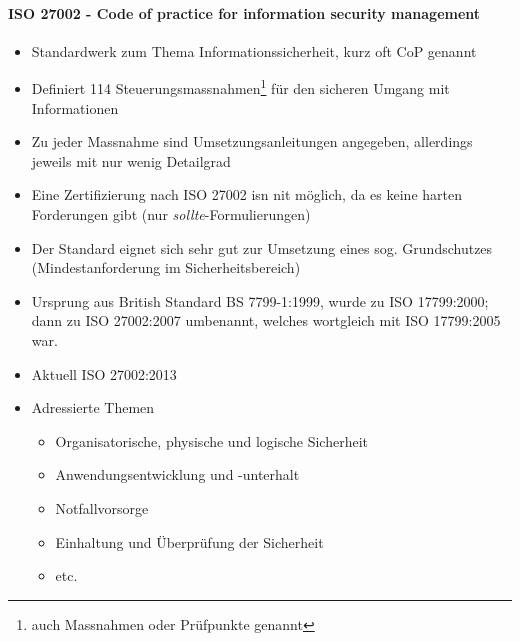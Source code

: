 \documentclass[10pt,a4paper]{article}
\begin{document}
\paragraph*{ISO 27002 - Code of practice for information security management}\label{para:ISO 27002}
\begin{itemize}[noitemsep,topsep=0pt,leftmargin=*]
    \item Standardwerk zum Thema Informationssicherheit, kurz oft CoP genannt
    \item Definiert 114 Steuerungsmassnahmen\footnote{auch Massnahmen oder Prüfpunkte genannt} für den sicheren Umgang mit Informationen
    \item Zu jeder Massnahme sind Umsetzungsanleitungen angegeben, allerdings jeweils mit nur wenig Detailgrad
    \item Eine Zertifizierung nach ISO 27002 isn nit möglich, da es keine harten Forderungen gibt (nur \textsl{sollte}-Formulierungen)
    \item Der Standard eignet sich sehr gut zur Umsetzung eines sog. Grundschutzes (Mindestanforderung im Sicherheitsbereich)
    \item Ursprung aus British Standard BS 7799-1:1999, wurde zu ISO 17799:2000; dann zu ISO 27002:2007 umbenannt, welches wortgleich mit ISO 17799:2005 war.
    \item Aktuell ISO 27002:2013
    \item Adressierte Themen
    \begin{itemize}[noitemsep,topsep=0pt,leftmargin=*]
        \item Organisatorische, physische und logische Sicherheit
        \item Anwendungsentwicklung und -unterhalt
        \item Notfallvorsorge
        \item Einhaltung und Überprüfung der Sicherheit
        \item etc.
    \end{itemize}
\end{itemize}
\end{document}
